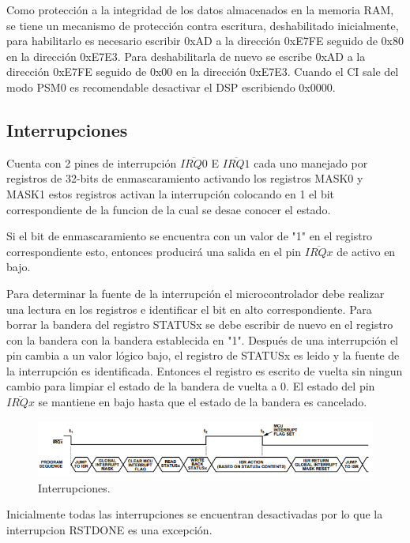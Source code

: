 \documentclass[letterpaper,12pt,oneside]{book}
\begin{document}
			Como protección a la integridad de los datos almacenados en la memoria RAM, se tiene un mecanismo de protección contra escritura, deshabilitado inicialmente, para habilitarlo es necesario escribir 0xAD a la dirección 0xE7FE seguido de 0x80 en la dirección 0xE7E3. Para deshabilitarla de nuevo se escribe 0xAD a la dirección 0xE7FE seguido de 0x00 en la dirección 0xE7E3. Cuando el CI sale del modo PSM0 es recomendable desactivar el DSP escribiendo 0x0000.

			\subsection{Interrupciones}
			Cuenta con 2 pines de interrupción $\overline{IRQ0}$ E $\overline{IRQ1}$ cada uno manejado por registros de 32-bits de enmascaramiento activando los registros MASK0 y MASK1 estos registros activan la interrupción colocando en 1 el bit correspondiente de la funcion de la cual se desae conocer el estado.

			Si el bit de enmascaramiento se encuentra con un valor de "1" en el registro correspondiente esto, entonces producirá una salida en el pin $\overline{IRQx}$ de activo en bajo.

			Para determinar la fuente de la interrupción el microcontrolador debe realizar una lectura en los registros e identificar el bit en alto correspondiente. Para borrar la bandera del registro STATUSx se debe escribir de nuevo en el registro con la bandera con la bandera establecida en "1". Después de una interrupción el pin cambia a un valor lógico bajo, el registro de STATUSx es leido y la fuente de la interrupción es identificada. Entonces el registro es escrito de vuelta sin ningun cambio para limpiar el estado de la bandera de vuelta a 0. El estado del pin $\overline{IRQx}$ se mantiene en bajo hasta que el estado de la bandera es cancelado.

			\begin{figure}[!htpb]
				\centering
				\includegraphics[scale = 0.8]{Material de Consulta/Interrupcion.PNG}
				\caption[Interrupciones]{Interrupciones.}
				\label{Intrr}
			\end{figure}

			Inicialmente todas las interrupciones se encuentran desactivadas por lo que la interrupcion RSTDONE es una excepción.
\end{document}
